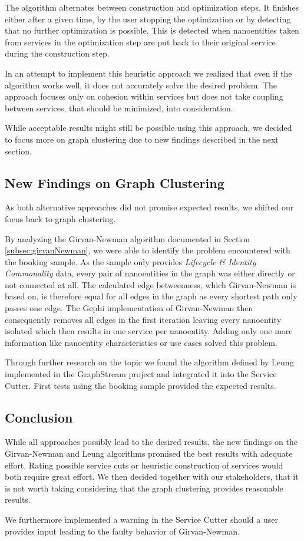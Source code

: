 The algorithm alternates between construction and optimization steps. It finishes either after a given time, by the user stopping the optimization or by detecting that no further optimization is possible. This is detected when nanoentities taken from services in the optimization step are put back to their original service during the construction step.

In an attempt to implement this heuristic approach we realized that even if the algorithm works well, it does not accurately solve the desired problem. The approach focuses only on cohesion within services but does not take coupling between services, that should be minimized, into consideration.

While acceptable results might still be possible using this approach, we decided to focus more on graph clustering due to new findings described in the next section.

\subsection{New Findings on Graph Clustering}

As both alternative approaches did not promise expected results, we shifted our focus back to graph clustering. 

By analyzing the Girvan-Newman algorithm documented in Section \ref{subsec:girvanNewman}, we were able to identify the problem encountered with the booking sample. As the sample only provides \textit{Lifecycle \& Identity Commonality} data, every pair of nanoentities in the graph was either directly or not connected at all. The calculated edge betweenness, which Girvan-Newman is based on, is therefore equal for all edges in the graph as every shortest path only passes one edge. The Gephi\cite{gephi} implementation of Girvan-Newman then consequently removes all edges in the first iteration leaving every nanoentity isolated which then results in one service per nanoentity. Adding only one more information like nanoentity characteristics or use cases solved this problem.

Through further research on the topic we found the algorithm defined by Leung implemented in the GraphStream\cite{leungGraphstream} project and integrated it into the Service Cutter. First tests using the booking sample provided the expected results.

\subsection{Conclusion}

While all approaches possibly lead to the desired results, the new findings on the Girvan-Newman and Leung algorithms promised the best results with adequate effort. Rating possible service cuts or heuristic construction of services would both require great effort. We then decided together with our stakeholders, that it is not worth taking considering that the graph clustering provides reasonable results. 

We furthermore implemented a warning in the Service Cutter should a user provides input leading to the faulty behavior of Girvan-Newman. %